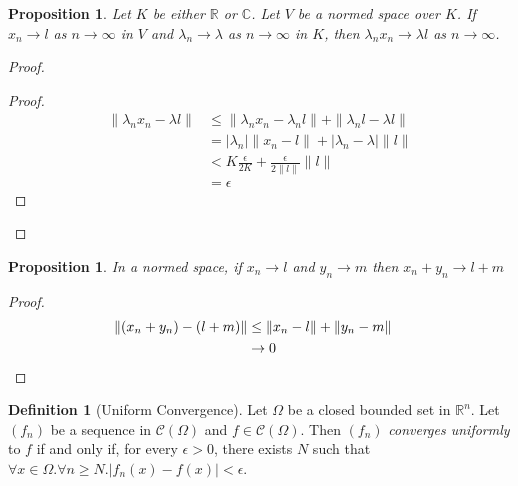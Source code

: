 \documentclass{book}
\let\qed\relax
\newtheorem{prop}[ax]{Proposition}
\theoremstyle{definition}
\newtheorem{df}[ax]{Definition}
\begin{document}
\begin{prop}
Let $K$ be either $\mathbb{R}$ or $\mathbb{C}$.
Let $V$ be a normed space over $K$. If $x_n \rightarrow l$ as $n \rightarrow \infty$ in $V$ and $\lambda_n \rightarrow \lambda$ as $n \rightarrow \infty$ in $K$, then $\lambda_n x_n \rightarrow \lambda l$ as $n \rightarrow \infty$.
\end{prop}

\begin{proof}
\pf
{}
\begin{proof}
	\pf
	\begin{align*}
		\| \lambda_n x_n - \lambda l \| & \leq \| \lambda_n x_n - \lambda_n l \| + \| \lambda_n l - \lambda l \| \\
		& = |\lambda_n| \| x_n - l \| + | \lambda_n - \lambda | \|l\| \\
		& < K \frac{\epsilon}{2K} + \frac{\epsilon}{2 \|l\|} \|l\| \\
		& = \epsilon
	\end{align*}
\end{proof}
\qed
\end{proof}

\begin{prop}
In a normed space, if $x_n \rightarrow l$ and $y_n \rightarrow m$ then $x_n + y_n \rightarrow l + m$
\end{prop}

\begin{proof}
\pf
\begin{align*}
\| (x_n + y_n) - (l + m) \| & \leq \| x_n - l \| + \| y_n - m \| \\
& \rightarrow 0 & \qed
\end{align*}
\end{proof}

\begin{df}[Uniform Convergence]
Let $\Omega$ be a closed bounded set in $\mathbb{R}^n$. Let $(f_n)$ be a sequence in $\mathcal{C}(\Omega)$ and $f \in \mathcal{C}(\Omega)$. Then $(f_n)$ \emph{converges uniformly} to $f$ if and only if, for every $\epsilon > 0$, there exists $N$ such that $\forall x \in \Omega. \forall n \geq N. |f_n(x) - f(x)| < \epsilon$.
\end{df}
\end{document}
